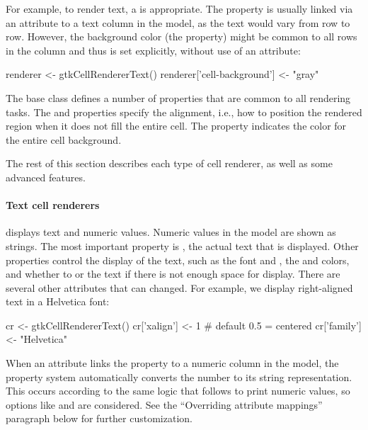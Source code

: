 For example, to render text, a  is
appropriate. The  property is usually linked via an
attribute to a text column in the model, as the text would vary from
row to row. However, the background color (the 
property) might be common to all rows in the column and thus is set
explicitly, without use of an attribute:
\begin{Schunk}
\begin{Sinput}
 renderer <- gtkCellRendererText()
 renderer['cell-background'] <- "gray"
\end{Sinput}
\end{Schunk}

The base class  defines a number of properties
that are common to all rendering tasks. The  and
 properties specify the alignment, i.e., how to position
the rendered region when it does not fill the entire cell. The
 property indicates the color for the entire
cell background.

The rest of this section describes each type of cell renderer, as well
as some advanced features.

\paragraph{Text cell renderers}

 displays text and numeric
values. Numeric values in the model are shown as strings.  The most
important property is , the actual text that is
displayed. Other properties control the display of the text, such as
the font  and , the  and
 colors, and whether to  or
 the text if there is not enough space for display. There
are several other attributes that can changed.  For example, we
display right-aligned text in a Helvetica font:
\begin{Schunk}
\begin{Sinput}
 cr <- gtkCellRendererText()
 cr['xalign'] <- 1                    # default 0.5 = centered
 cr['family'] <- "Helvetica"  
\end{Sinput}
\end{Schunk}

When an attribute links the  property to a numeric column
in the model, the property system automatically converts the number to
its string representation. This occurs according to the same logic
that \R\/ follows to print numeric values, so options like
 and  are considered. See the ``Overriding
attribute mappings'' paragraph below for further customization.


